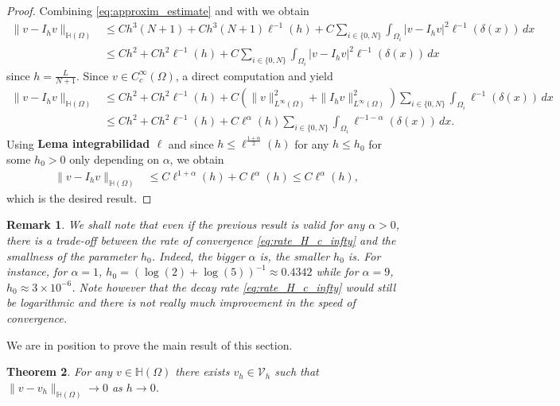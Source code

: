 \documentclass[11 pt]{article}
\newcommand\blue[1]{{\color{blue}\textbf{#1}}}
\newtheorem{theorem}{Theorem}[section]
\newtheorem{remark}[theorem]{Remark}
\numberwithin{equation}{section}
\begin{document}
\begin{proof}
Combining \eqref{eq:approxim_estimate} and  with  we obtain
%
\begin{align*}
    \|v-I_h v\|_{\mathbb H(\Omega)}&\leq  C h^3(N+1)+Ch^3(N+1)\ell^{-1}(h)+C\sum_{i\in\{0,N\}}\int_{\Omega_i}|v-I_h v|^2\ell^{-1}(\delta(x))\,dx \\
    &\leq Ch^2+Ch^2\ell^{-1}(h)+C\sum_{i\in\{0,N\}}\int_{\Omega_i}|v-I_h v|^2\ell^{-1}(\delta(x))\,dx
\end{align*}
since $h=\frac{L}{N+1}$. Since $v\in C_c^\infty(\Omega)$, a direct computation and  yield
%
\begin{align*}
    \|v-I_h v\|_{\mathbb H(\Omega)} &\leq Ch^2+Ch^2\ell^{-1}(h)+C\left(\|v\|_{L^\infty(\Omega)}^2+\|I_hv\|^2_{L^\infty(\Omega)}\right)\sum_{i\in\{0,N\}}\int_{\Omega_i}\ell^{-1}(\delta(x))\,dx \\
    & \leq Ch^2+Ch^2\ell^{-1}(h)+C\ell^{\alpha}(h)\sum_{i\in\{0,N\}}\int_{\Omega_i}\ell^{-1-\alpha}(\delta(x))\,dx.
\end{align*}
%
Using \blue{Lema integrabilidad $\ell$} and since $h\leq \ell^{\frac{1+\alpha}{2}}(h)$ for any $h\leq h_0$ for some $h_0>0$ only depending on $\alpha$, we obtain 
%
\begin{align*}
    \|v-I_h v\|_{\mathbb H(\Omega)}
    & \leq C\ell^{1+\alpha}(h)+C\ell^{\alpha}(h)\leq C \ell^{\alpha}(h),
\end{align*}
which is the desired result.
\end{proof}

\begin{remark}
We shall note that even if the previous result is valid for any $\alpha>0$, there is a trade-off between the rate of convergence \eqref{eq:rate_H_c_infty} and the smallness of the parameter $h_0$. Indeed, the bigger $\alpha$ is, the smaller $h_0$ is. For instance, for $\alpha=1$, $h_0=(\log(2)+\log(5))^{-1}\approx 0.4342$ while for $\alpha=9$, $h_0\approx 3\times 10^{-6}$. Note however that the decay rate \eqref{eq:rate_H_c_infty} would still be logarithmic and there is not really much improvement in the speed of convergence.  
\end{remark}

We are in position to prove the main result of this section.

\begin{theorem}\label{density:thm}
    For any $v\in\mathbb H(\Omega)$ there exists $v_h\in\mathcal V_h$ such that $\|v-v_h\|_{\mathbb H(\Omega)}\to 0$ as $h\to 0$. 
\end{theorem}
\end{document}
